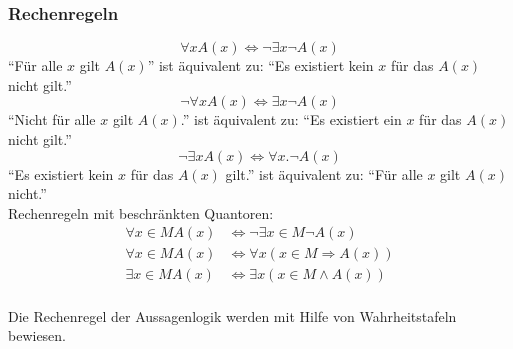 \subsubsection{Rechenregeln}
\begin{equation*}
	\forall x A(x) \Leftrightarrow \neg \exists x \neg A(x)
\end{equation*}
\enquote{Für alle $x$ gilt $A(x)$} ist äquivalent zu: \enquote{Es existiert kein $x$ für das $A(x)$ nicht gilt.}
\begin{equation*}
		\neg \forall x A(x) \Leftrightarrow \exists x \neg A(x)
\end{equation*}
\enquote{Nicht für alle $x$ gilt $A(x)$.} ist äquivalent zu: \enquote{Es existiert ein $x$ für das $A(x)$ nicht gilt.}
\begin{equation*}
			\neg \exists x A(x) \Leftrightarrow \forall x. \neg A(x)
\end{equation*}
\enquote{Es existiert kein $x$ für das $A(x)$ gilt.} ist äquivalent zu: \enquote{Für alle $x$ gilt $A(x)$ nicht.}\\
Rechenregeln mit beschränkten Quantoren:
\begin{equation*}
	\begin{array}{rl}
		\forall x \in M A(x) & \Leftrightarrow \neg \exists x \in M \neg A(x)\\
		\forall x \in M A(x) & \Leftrightarrow \forall x(x \in M \Rightarrow A(x))\\
		\exists x \in M A(x) & \Leftrightarrow \exists x (x \in M \wedge A(x))\\
	\end{array}
\end{equation*}

Die Rechenregel der Aussagenlogik werden mit Hilfe von Wahrheitstafeln bewiesen.

